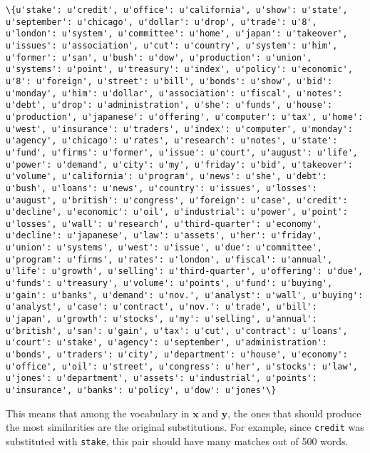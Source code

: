 \documentclass{article}
\begin{document}
    \begin{Verbatim}[commandchars=\\\{\}]
\{u'stake': u'credit', u'office': u'california', u'show': u'state', u'september': u'chicago', u'dollar': u'drop', u'trade': u'8', u'london': u'system', u'committee': u'home', u'japan': u'takeover', u'issues': u'association', u'cut': u'country', u'system': u'him', u'former': u'san', u'bush': u'dow', u'production': u'union', u'systems': u'point', u'treasury': u'index', u'policy': u'economic', u'8': u'foreign', u'street': u'bill', u'bonds': u'show', u'bid': u'monday', u'him': u'dollar', u'association': u'fiscal', u'notes': u'debt', u'drop': u'administration', u'she': u'funds', u'house': u'production', u'japanese': u'offering', u'computer': u'tax', u'home': u'west', u'insurance': u'traders', u'index': u'computer', u'monday': u'agency', u'chicago': u'rates', u'research': u'notes', u'state': u'fund', u'firms': u'former', u'issue': u'court', u'august': u'life', u'power': u'demand', u'city': u'my', u'friday': u'bid', u'takeover': u'volume', u'california': u'program', u'news': u'she', u'debt': u'bush', u'loans': u'news', u'country': u'issues', u'losses': u'august', u'british': u'congress', u'foreign': u'case', u'credit': u'decline', u'economic': u'oil', u'industrial': u'power', u'point': u'losses', u'wall': u'research', u'third-quarter': u'economy', u'decline': u'japanese', u'law': u'assets', u'her': u'friday', u'union': u'systems', u'west': u'issue', u'due': u'committee', u'program': u'firms', u'rates': u'london', u'fiscal': u'annual', u'life': u'growth', u'selling': u'third-quarter', u'offering': u'due', u'funds': u'treasury', u'volume': u'points', u'fund': u'buying', u'gain': u'banks', u'demand': u'nov.', u'analyst': u'wall', u'buying': u'analyst', u'case': u'contract', u'nov.': u'trade', u'bill': u'japan', u'growth': u'stocks', u'my': u'selling', u'annual': u'british', u'san': u'gain', u'tax': u'cut', u'contract': u'loans', u'court': u'stake', u'agency': u'september', u'administration': u'bonds', u'traders': u'city', u'department': u'house', u'economy': u'office', u'oil': u'street', u'congress': u'her', u'stocks': u'law', u'jones': u'department', u'assets': u'industrial', u'points': u'insurance', u'banks': u'policy', u'dow': u'jones'\}
    \end{Verbatim}

    This means that among the vocabulary in \(\mathbf{x}\) and
\(\mathbf{y}\), the ones that should produce the most similarities are
the original substitutions. For example, since \texttt{credit} was
substituted with \texttt{stake}, this pair should have many matches out
of 500 words.
\end{document}
